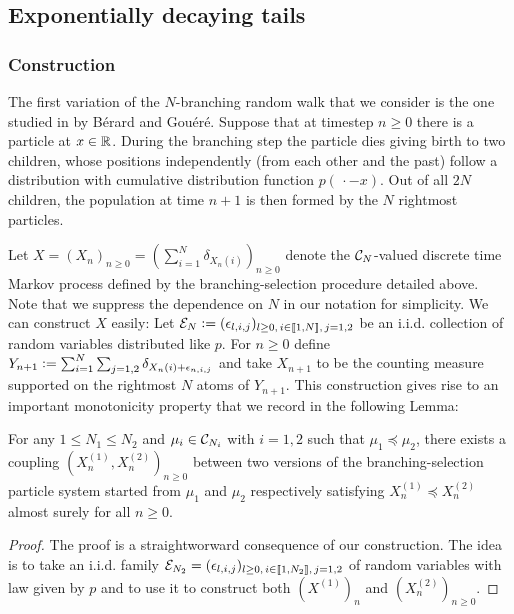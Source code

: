 \subsection{Exponentially decaying tails}
\subsubsection{Construction}

The first variation of the $N$-branching random walk that we consider is the one studied in \cite{exp_tails} by Bérard and Gouéré. Suppose that at timestep $n \geq 0$ there is a particle at $x \in \R$. During the branching step the particle dies giving birth to two children, whose positions independently (from each other and the past) follow a distribution with cumulative distribution function $p(\,\cdot - x)$. Out of all $2N$ children, the population at time $n+1$ is then formed by the $N$ rightmost particles. 
\begin{construction} Let $X = (X_n)_{n \geq 0} = (\sum_{i = 1}^N \delta_{X_n(i)})_{n \geq 0}$ denote the $\cal{C}_N$-valued discrete time Markov process defined by the branching-selection procedure detailed above. Note that we suppress the dependence on $N$ in our notation for simplicity. We can construct $X$ easily: Let $\cal{E}_N \defeq (\epsilon_{l, i, j})_{l \geq 0,\,i \in \bbracket{1,N},\,j = 1,2}$ be an i.i.d. collection of random variables distributed like $p$. For $n \geq 0$ define $Y_{n+1} \defeq \sum_{i = 1}^N \sum_{j=1,2} \delta_{X_n(i) + \epsilon_{n, i, j}}$ and take $X_{n+1}$ to be the counting measure supported on the rightmost $N$ atoms of $Y_{n+1}$. This construction gives rise to an important monotonicity property that we record in the following Lemma:
\end{construction}

\begin{lemma}\label{lem:monotonicity}
For any $1 \leq N_1 \leq N_2$ and $\mu_i \in \cal{C}_{N_i}$ with $i=1,2$ such that $\mu_1 \preceq \mu_2$, there exists a coupling $(X^{(1)}_n, X^{(2)}_n)_{n \geq 0}$ between two versions of the branching-selection particle system started from $\mu_1$ and $\mu_2$ respectively satisfying $X^{(1)}_n \preceq X^{(2)}_n$ almost surely for all $n \geq 0$. 
\end{lemma}
\begin{proof}
The proof is a straightworward consequence of our construction. The idea is to take an i.i.d. family $\cal{E}_{N_2} = (\epsilon_{l,i,j})_{l \geq 0,\, i \in \bbracket{1, N_2},\, j = 1,2}$ of random variables with law given by $p$ and to use it to construct both $(X^{(1)})_n$ and $(X^{(2)}_n)_{n \geq 0}$.  
\end{proof}

